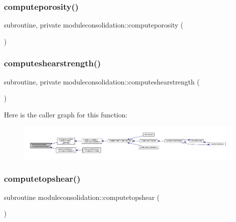 \subsubsection{\texorpdfstring{computeporosity()}{computeporosity()}}
{\footnotesize\ttfamily subroutine, private moduleconsolidation\+::computeporosity (\begin{DoxyParamCaption}{ }\end{DoxyParamCaption})\hspace{0.3cm}{\ttfamily [private]}}

\mbox{\label{namespacemoduleconsolidation_a461bd405c7105d5b33217ef55e3d96b2}} 
\subsubsection{\texorpdfstring{computeshearstrength()}{computeshearstrength()}}
{\footnotesize\ttfamily subroutine, private moduleconsolidation\+::computeshearstrength (\begin{DoxyParamCaption}{ }\end{DoxyParamCaption})\hspace{0.3cm}{\ttfamily [private]}}

Here is the caller graph for this function\+:\nopagebreak
\begin{figure}[H]
\begin{center}
\leavevmode
\includegraphics[width=350pt]{namespacemoduleconsolidation_a461bd405c7105d5b33217ef55e3d96b2_icgraph}
\end{center}
\end{figure}
\mbox{\label{namespacemoduleconsolidation_a414e2c5a165b95dd5af3741e90f53de4}} 
\subsubsection{\texorpdfstring{computetopshear()}{computetopshear()}}
{\footnotesize\ttfamily subroutine moduleconsolidation\+::computetopshear (\begin{DoxyParamCaption}{ }\end{DoxyParamCaption})\hspace{0.3cm}{\ttfamily [private]}}

